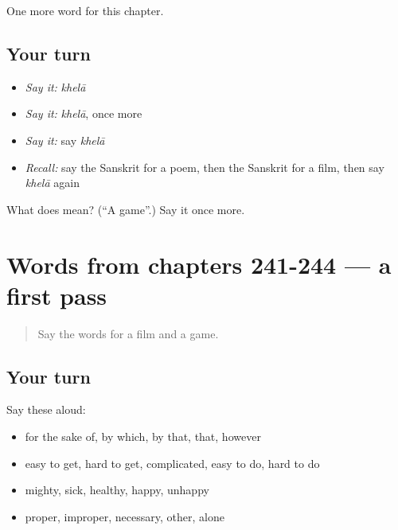 \begin{grammarlens}[title={What you've built}]
One more word for this chapter.
\end{grammarlens}

\subsection*{Your turn}
\begin{itemize}
\raggedright
  \item \emph{Say it:} \emph{khelā}
  \item \emph{Say it:} \emph{khelā}, once more
  \item \emph{Say it:} say \emph{khelā}
  \item \emph{Recall:} say the Sanskrit for a poem, then the Sanskrit for a film, then say \emph{khelā} again
\end{itemize}

\begin{tcolorbox}[breakable,colback=teal!4,colframe=teal!35!black,title={Before you move on}]
What does  mean? (\textquotedblleft{}A game\textquotedblright{}.) Say it once more.
\end{tcolorbox}
\section[(dialogue)]{Words from chapters 241-244 — a first pass}

\label{lesson:SA-R249-first-pass-words-from-chapters-241-244}



\begin{quote}
Say the words for a film and a game.
\end{quote}

\subsection*{Your turn}
Say these aloud:

\begin{itemize}
\raggedright
  \item for the sake of, by which, by that, that, however
  \item easy to get, hard to get, complicated, easy to do, hard to do
  \item mighty, sick, healthy, happy, unhappy
  \item proper, improper, necessary, other, alone
\end{itemize}

